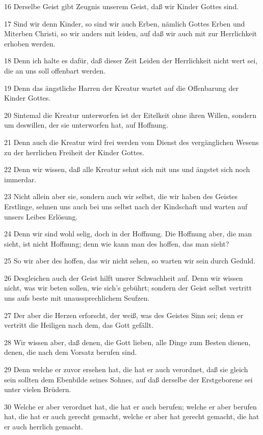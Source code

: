 \par 16 Derselbe Geist gibt Zeugnis unserem Geist, daß wir Kinder Gottes sind.
\par 17 Sind wir denn Kinder, so sind wir auch Erben, nämlich Gottes Erben und Miterben Christi, so wir anders mit leiden, auf daß wir auch mit zur Herrlichkeit erhoben werden.
\par 18 Denn ich halte es dafür, daß dieser Zeit Leiden der Herrlichkeit nicht wert sei, die an uns soll offenbart werden.
\par 19 Denn das ängstliche Harren der Kreatur wartet auf die Offenbarung der Kinder Gottes.
\par 20 Sintemal die Kreatur unterworfen ist der Eitelkeit ohne ihren Willen, sondern um deswillen, der sie unterworfen hat, auf Hoffnung.
\par 21 Denn auch die Kreatur wird frei werden vom Dienst des vergänglichen Wesens zu der herrlichen Freiheit der Kinder Gottes.
\par 22 Denn wir wissen, daß alle Kreatur sehnt sich mit uns und ängstet sich noch immerdar.
\par 23 Nicht allein aber sie, sondern auch wir selbst, die wir haben des Geistes Erstlinge, sehnen uns auch bei uns selbst nach der Kindschaft und warten auf unsers Leibes Erlösung.
\par 24 Denn wir sind wohl selig, doch in der Hoffnung. Die Hoffnung aber, die man sieht, ist nicht Hoffnung; denn wie kann man des hoffen, das man sieht?
\par 25 So wir aber des hoffen, das wir nicht sehen, so warten wir sein durch Geduld.
\par 26 Desgleichen auch der Geist hilft unsrer Schwachheit auf. Denn wir wissen nicht, was wir beten sollen, wie sich's gebührt; sondern der Geist selbst vertritt uns aufs beste mit unaussprechlichem Seufzen.
\par 27 Der aber die Herzen erforscht, der weiß, was des Geistes Sinn sei; denn er vertritt die Heiligen nach dem, das Gott gefällt.
\par 28 Wir wissen aber, daß denen, die Gott lieben, alle Dinge zum Besten dienen, denen, die nach dem Vorsatz berufen sind.
\par 29 Denn welche er zuvor ersehen hat, die hat er auch verordnet, daß sie gleich sein sollten dem Ebenbilde seines Sohnes, auf daß derselbe der Erstgeborene sei unter vielen Brüdern.
\par 30 Welche er aber verordnet hat, die hat er auch berufen; welche er aber berufen hat, die hat er auch gerecht gemacht, welche er aber hat gerecht gemacht, die hat er auch herrlich gemacht.
